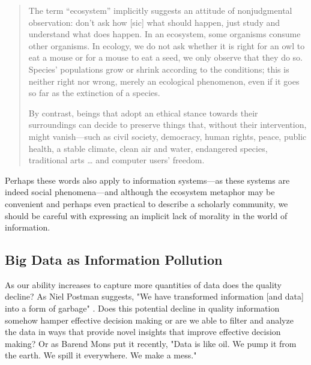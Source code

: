 \begin{quote}
The term “ecosystem” implicitly suggests an attitude of nonjudgmental observation: don't ask how [sic] what should happen, just study and understand what does happen. In an ecosystem, some organisms consume other organisms. In ecology, we do not ask whether it is right for an owl to eat a mouse or for a mouse to eat a seed, we only observe that they do so. Species' populations grow or shrink according to the conditions; this is neither right nor wrong, merely an ecological phenomenon, even if it goes so far as the extinction of a species.

By contrast, beings that adopt an ethical stance towards their surroundings can decide to preserve things that, without their intervention, might vanish—such as civil society, democracy, human rights, peace, public health, a stable climate, clean air and water, endangered species, traditional arts … and computer users' freedom. \citep{fsf_2014}
\end{quote}

Perhaps these words also apply to information systems—as these systems are indeed social phenomena—and although the ecosystem metaphor may be convenient and perhaps even practical to describe a scholarly community, we should be careful with expressing an implicit lack of morality in the world of information. 

\subsection{Big Data as Information Pollution}

As our ability increases to capture more quantities of data does the quality decline? As Niel Postman suggests, "We have transformed information [and data] into a form of garbage" \citep[cited in][p. 50]{stepp_1999}. Does this potential decline in quality information somehow hamper effective decision making or are we able to filter and analyze the data in ways that provide novel insights that improve effective decision making? Or as Barend Mons put it recently, "Data is like oil. We pump it from the earth. We spill it everywhere. We make a mess." \citep{mons_2016}


